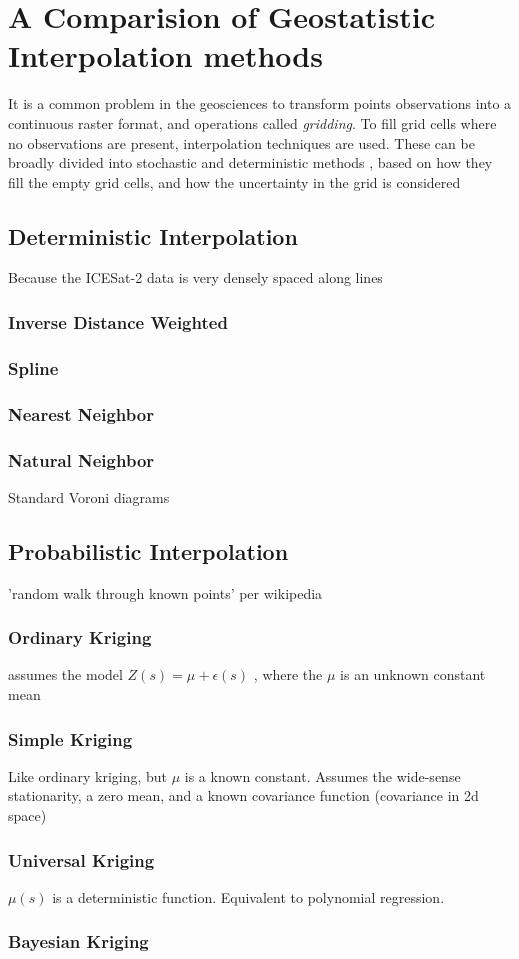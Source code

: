 \chapter{A Comparision of Geostatistic Interpolation methods}
It is a common problem in the geosciences to transform points observations into a continuous raster format, and operations called \emph{gridding}. To fill grid cells where no observations are present, interpolation techniques are used. These can be broadly divided into stochastic and deterministic methods \parencite{}, based on how they fill the empty grid cells, and how the uncertainty in the grid is considered 

\section{Deterministic Interpolation}
Because the ICESat-2 data is very densely spaced along lines
\subsection{Inverse Distance Weighted}
\subsection{Spline}
\subsection{Nearest Neighbor}

\subsection{Natural Neighbor}
Standard Voroni diagrams

\section{Probabilistic Interpolation}
'random walk through known points' per wikipedia
\subsection{Ordinary Kriging}
assumes the model $Z(s) = \mu + \epsilon(s)$ \parencite{esri site}, where the $\mu$ is an unknown constant mean

\subsection{Simple Kriging}
Like ordinary kriging, but $\mu$ is a known constant. Assumes the wide-sense stationarity, a zero mean, and a known covariance function (covariance in 2d space)
\subsection{Universal Kriging}
$\mu(s)$ is a deterministic function. Equivalent to polynomial regression. 
\subsection{Bayesian Kriging}